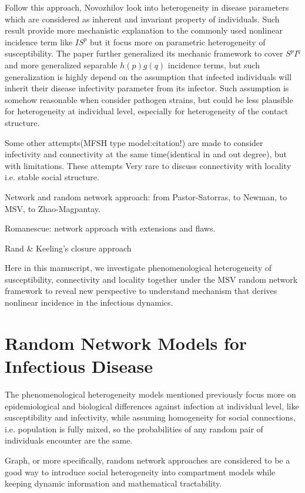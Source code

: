 \documentclass[12pt]{article}
\theoremstyle{plain}
\theoremstyle{definition}
\begin{document}
Follow this approach, Novozhilov\cite{Novozhilov:2008} look into heterogeneity in disease parameters which are considered as inherent and invariant property of individuals.
Such result provide more mechanistic explanation to the commonly used nonlinear incidence term like $I S^p$ but it focus more on parametric heterogeneity of susceptibility.
The paper further generalized its mechanic framework to cover $S^p I^q$ and more generalized separable $h(p) g(q)$ incidence terms, but such generalization is highly depend on the assumption that infected individuals will inherit their disease infectivity parameter from its infector.
Such assumption is somehow reasonable when consider pathogen strains, but could be less plausible for heterogeneity at individual level, especially for heterogeneity of the contact structure.

Some other attempts(MFSH type model:citation!) are made to consider infectivity and connectivity at the same time(identical in and out degree), but with limitations.
These attempts Very rare to discuss connectivity with locality i.e. stable social structure.

Network and random network approach: from Pastor-Satorras, to Newman, to MSV, to Zhao-Magpantay.

Romanescue: network approach with extensions and flaws.

Rand \& Keeling's closure approach 

Here in this manuscript, we investigate phenomenological heterogeneity of susceptibility, connectivity and locality together under the MSV random network framework to reveal new perspective to understand mechanism that derives nonlinear incidence in the infectious dynamics.


\section{Random Network Models for Infectious Disease}
\label{sec: Network}

The phenomenological heterogeneity models mentioned previously focus more on epidemiological and biological differences against infection at individual level, like susceptibility and infectivity, while assuming homogeneity for social connections, i.e. population is fully mixed, so the probabilities of any random pair of individuals encounter are the same.

Graph, or more specifically, random network approaches are considered to be a good way to introduce social heterogeneity into compartment models while keeping dynamic information and mathematical tractability.
\end{document}
